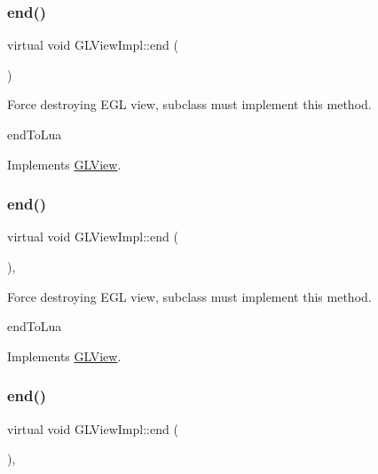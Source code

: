\subsubsection{\texorpdfstring{end()}{end()}\hspace{0.1cm}{\footnotesize\ttfamily [4/9]}}
{\footnotesize\ttfamily virtual void G\+L\+View\+Impl\+::end (\begin{DoxyParamCaption}{ }\end{DoxyParamCaption})\hspace{0.3cm}{\ttfamily [virtual]}}

Force destroying E\+GL view, subclass must implement this method.

end\+To\+Lua 

Implements \hyperlink{classGLView_aaa284e08de7b4e530a2b15b1d27dced0}{G\+L\+View}.

\mbox{\label{classGLViewImpl_ab5a08a3ea92598cdabbed94686eed58a}} 
\subsubsection{\texorpdfstring{end()}{end()}\hspace{0.1cm}{\footnotesize\ttfamily [5/9]}}
{\footnotesize\ttfamily virtual void G\+L\+View\+Impl\+::end (\begin{DoxyParamCaption}{ }\end{DoxyParamCaption})\hspace{0.3cm}{\ttfamily [override]}, {\ttfamily [virtual]}}

Force destroying E\+GL view, subclass must implement this method.

end\+To\+Lua 

Implements \hyperlink{classGLView_aaa284e08de7b4e530a2b15b1d27dced0}{G\+L\+View}.

\mbox{\label{classGLViewImpl_ab5a08a3ea92598cdabbed94686eed58a}} 
\subsubsection{\texorpdfstring{end()}{end()}\hspace{0.1cm}{\footnotesize\ttfamily [6/9]}}
{\footnotesize\ttfamily virtual void G\+L\+View\+Impl\+::end (\begin{DoxyParamCaption}{ }\end{DoxyParamCaption})\hspace{0.3cm}{\ttfamily [override]}, {\ttfamily [virtual]}}

